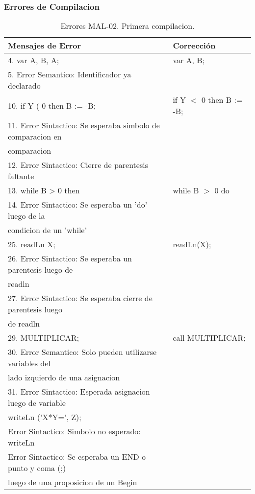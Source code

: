 \documentclass[a4paper,12pt]{article}
\begin{document}
\subsubsection{Errores de Compilacion}

\begin{table}[H]
\centering
\begin{tabular}{|l|l|}
\hline
Mensajes de Error & Corrección\\
\hline
4. var A, B, A;												& var A, B;\\
5. Error Semantico: Identificador ya declarado				&\\
10. if Y ( 0 then B := -B;									& if Y $<$ 0 then B := -B;\\
11. Error Sintactico: Se esperaba simbolo de comparacion en 	&\\
comparacion													&\\
12. Error Sintactico: Cierre de parentesis faltante			&\\
\hline
13. while B > 0 then											& while B $>$ 0 do\\
14. Error Sintactico: Se esperaba un 'do' luego de la		&\\
condicion de un 'while'										&\\
\hline
25. readLn X;												& readLn(X);\\
26. Error Sintactico: Se esperaba un parentesis luego de		& \\
readln 														& \\
27. Error Sintactico: Se esperaba cierre de parentesis luego	& \\
de readln 													& \\
\hline
29. MULTIPLICAR;												& call MULTIPLICAR;\\
30. Error Semantico: Solo pueden utilizarse variables del 	&\\
lado izquierdo de una asignacion								&\\
31. Error Sintactico: Esperada asignacion luego de variable	&\\
writeLn ('X*Y=', Z);											&\\
Error Sintactico: Simbolo no esperado: writeLn				&\\
Error Sintactico: Se esperaba un END o punto y coma (;)		&\\
luego de una proposicion de un Begin							&\\
\hline	
\end{tabular}
\caption{Errores MAL-02. Primera compilacion.}
\label{MAL-02-1}
\end{table}
\end{document}
